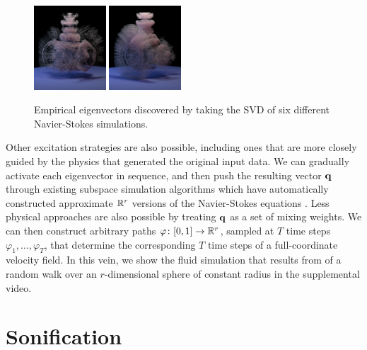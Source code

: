 \documentclass[11pt]{article}
\begin{document}
\begin{figure}
	\includegraphics[width=0.24\textwidth]{Figures/modes/plume0006.png}
	\includegraphics[width=0.24\textwidth]{Figures/modes/plume0007.png}
	\caption{Empirical eigenvectors discovered by taking the SVD of six different Navier-Stokes simulations.}
	\label{fig:eigs}
\end{figure}

Other excitation strategies are also possible, including ones that are more closely guided by the physics that generated the original input data. We can gradually activate each eigenvector in sequence, and then push the resulting vector $\mathbf{q}$ through existing subspace simulation algorithms which have automatically constructed approximate $\mathbb{R}^r$ versions of the Navier-Stokes equations \cite{Kim2013}. Less physical approaches are also possible by treating $\mathbf{q}$ as a set of mixing weights. We can then construct arbitrary paths $\varphi \colon [0, 1] \rightarrow \mathbb{R}^r$, sampled at $T$ time steps $\varphi_1, \ldots, \varphi_T$, that determine the corresponding $T$ time steps of a full-coordinate velocity field. In this vein, we show the fluid simulation that results from of a random walk over an $r$-dimensional sphere of constant radius in the supplemental video. %

\section*{Sonification}
\end{document}
